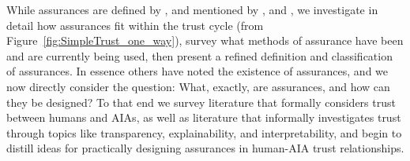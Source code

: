     While assurances are defined by \citeauthor{Lillard2016-yg}, and mentioned by \citeauthor{McKnight2001-fa}, and \citeauthor{Corritore2003-gx}, we investigate in detail how assurances fit within the trust cycle (from Figure~\ref{fig:SimpleTrust_one_way}), survey what methods of assurance have been and are currently being used, then present a refined definition and classification of assurances. In essence others have noted the existence of assurances, and we now directly consider the question: What, exactly, are assurances, and how can they be designed? To that end we survey literature that formally considers trust between humans and AIAs, as well as literature that informally investigates trust through topics like transparency, explainability, and interpretability, and begin to distill ideas for practically designing assurances in human-AIA trust relationships.





